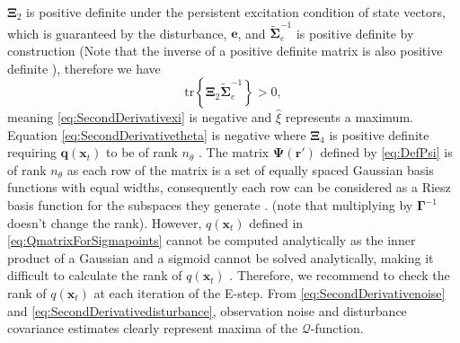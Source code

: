\documentclass[]{article}
\begin{document}
$\boldsymbol\Xi_2$ is positive definite under the persistent excitation condition of state vectors, which is guaranteed by the disturbance, $\mathbf e$, and $\tilde{\boldsymbol\Sigma}_e^{-1}$ is positive definite by construction (Note that the inverse of a positive definite matrix is also positive definite \cite{Horn2005}), therefore we have \cite{Coope1994}
\begin{equation}
 \mathrm{tr}\left\lbrace \boldsymbol\Xi_2 \tilde{\boldsymbol\Sigma}_e^{-1}\right\rbrace >0,
\end{equation}
meaning \eqref{eq:SecondDerivativexi} is negative and $\hat{\xi}$ represents a maximum. Equation \eqref{eq:SecondDerivativetheta} is negative where $\boldsymbol\Xi_4$ is positive definite requiring $\mathbf q(\mathbf x_t)$ to be of  rank $n_{\theta}$ \cite{Golub1996}. The matrix $\boldsymbol\Psi(\mathbf r')$ defined by \eqref{eq:DefPsi} is of rank $n_{\theta}$ as each row of the matrix is a set of equally spaced Gaussian basis functions with equal widths, consequently each row can be considered as a Riesz basis function for the subspaces they generate \cite{Ferrari2004}. (note that multiplying by $\mathbf \Gamma^{-1}$ doesn't change the rank). However, $q(\mathbf x_t)$ defined in \eqref{eq:QmatrixForSigmapoints} cannot be computed analytically as the inner product of a Gaussian and a sigmoid cannot be solved analytically, making it difficult to calculate the rank of $q(\mathbf x_t)$ . Therefore, we recommend to check the rank of $q(\mathbf x_t)$ at each iteration of the E-step.
From \eqref{eq:SecondDerivativenoise} and \eqref{eq:SecondDerivativedisturbance}, observation noise and disturbance covariance estimates clearly represent maxima of the $\mathcal{Q}$-function. 
 
\end{document}
